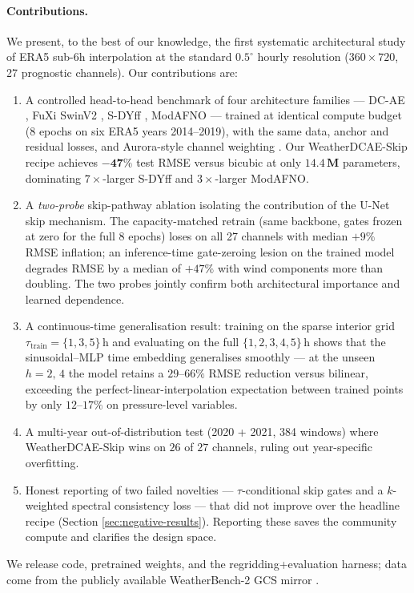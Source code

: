 \documentclass[10pt,letterpaper,twocolumn]{article}
\begin{document}
\paragraph{Contributions.}
We present, to the best of our knowledge, the first systematic
architectural study of ERA5 sub-6h interpolation at the standard
$0.5^\circ$ hourly resolution ($360{\times}720$, 27 prognostic channels).
Our contributions are:
\begin{enumerate}[topsep=2pt,itemsep=2pt,leftmargin=*]
\item A controlled head-to-head benchmark of four architecture families
      --- DC-AE \cite{xie2024dcae}, FuXi SwinV2
      \cite{chen2023fuxi,liu2022swinv2}, S-DYff
      \cite{cachay2023dyffusion,bonev2023sfno}, ModAFNO
      \cite{leinonen2024modafno} --- trained at identical compute budget
      (8 epochs on six ERA5 years 2014--2019), with the same data,
      anchor and residual losses, and Aurora-style channel weighting
      \cite{bodnar2024aurora}. Our WeatherDCAE-Skip recipe achieves
      $\mathbf{-47\%}$ test RMSE versus bicubic at only
      $\mathbf{14.4\,\text{M}}$ parameters, dominating
      $7{\times}$-larger S-DYff and $3{\times}$-larger ModAFNO.
\item A \emph{two-probe} skip-pathway ablation isolating the
      contribution of the U-Net skip mechanism. The capacity-matched
      retrain (same backbone, gates frozen at zero for the full 8 epochs)
      loses on all 27 channels with median $+9\%$ RMSE inflation; an
      inference-time gate-zeroing lesion on the trained model degrades
      RMSE by a median of $+47\%$ with wind components more than
      doubling. The two probes jointly confirm both architectural
      importance and learned dependence.
\item A continuous-time generalisation result: training on the sparse
      interior grid $\tau_\text{train}{=}\{1,3,5\}\,$h and evaluating on
      the full $\{1,2,3,4,5\}\,$h shows that the sinusoidal--MLP time
      embedding generalises smoothly --- at the unseen
      $h{=}2,\,4$ the model retains a $29$--$66\%$ RMSE reduction versus
      bilinear, exceeding the perfect-linear-interpolation expectation
      between trained points by only $12$--$17\%$ on pressure-level
      variables.
\item A multi-year out-of-distribution test (2020 + 2021, 384 windows)
      where WeatherDCAE-Skip wins on $26$ of $27$ channels, ruling out
      year-specific overfitting.
\item Honest reporting of two failed novelties --- $\tau$-conditional
      skip gates and a $k$-weighted spectral consistency loss --- that
      did not improve over the headline recipe (Section
      \ref{sec:negative-results}). Reporting these saves the community
      compute and clarifies the design space.
\end{enumerate}
We release code, pretrained weights, and the regridding+evaluation
harness; data come from the publicly available WeatherBench-2 GCS
mirror \cite{leinonen2024modafno}.
\end{document}
